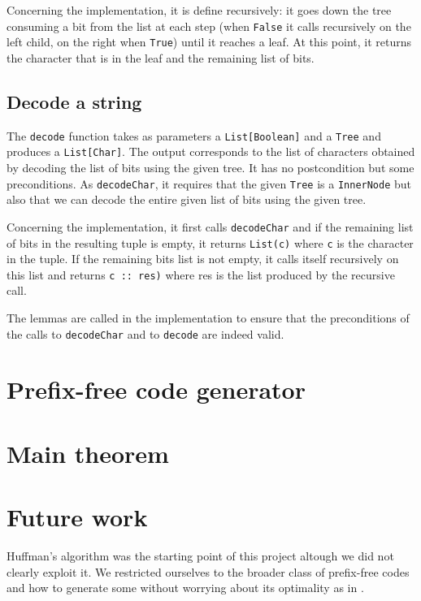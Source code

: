 \documentclass[a4paper,UKenglish,cleveref, autoref, thm-restate]{lipics-v2021}
\begin{document}
Concerning the implementation, it is define recursively: it goes down the tree consuming a bit from the list at each step (when \lstinline{False} it calls recursively on the left child, on the right when \lstinline{True}) until it reaches a leaf. At this point,
it returns the character that is in the leaf and the remaining list of bits.

\subsection{Decode a string}
The \lstinline{decode} function takes as parameters a \lstinline{List[Boolean]} and a \lstinline{Tree} and produces a \lstinline{List[Char]}. The output corresponds to the list of characters obtained by decoding the list of bits using the given tree.
It has no postcondition but some preconditions. As \lstinline{decodeChar}, it requires that the given \lstinline{Tree} is a \lstinline{InnerNode} but also that we can decode the entire given list of bits using the given tree.

Concerning the implementation, it first calls \lstinline{decodeChar} and if the remaining list of bits in the resulting tuple is empty, it returns \lstinline{List(c)} where \lstinline{c} is the character in the tuple. If the remaining bits list is not empty,
it calls itself recursively on this list and returns \lstinline{c :: res)} where res is the list produced by the recursive call.

The lemmas are called in the implementation to ensure that the preconditions of the calls to \lstinline{decodeChar} and to \lstinline{decode} are indeed valid.


\section{Prefix-free code generator} %

\section{Main theorem}

\section{Future work}

Huffman's algorithm was the starting point of this project altough we did not clearly exploit it. We restricted ourselves to the broader class of prefix-free codes and how to generate some without worrying about its optimality as in \cite{blanchette}. 
\end{document}
